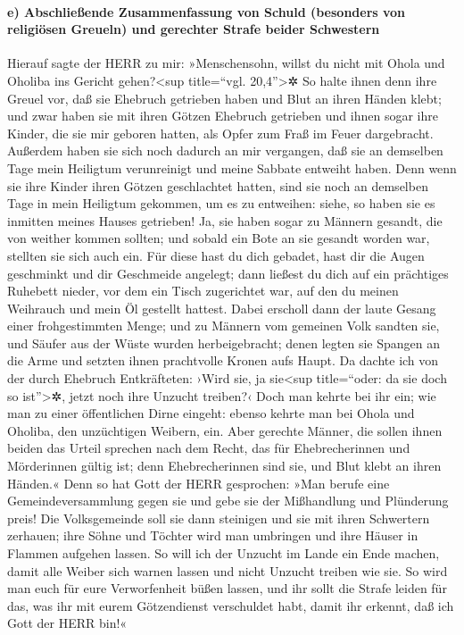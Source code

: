 \hypertarget{e-abschlieuxdfende-zusammenfassung-von-schuld-besonders-von-religiuxf6sen-greueln-und-gerechter-strafe-beider-schwestern}{%
\paragraph{e) Abschließende Zusammenfassung von Schuld (besonders von
religiösen Greueln) und gerechter Strafe beider
Schwestern}\label{e-abschlieuxdfende-zusammenfassung-von-schuld-besonders-von-religiuxf6sen-greueln-und-gerechter-strafe-beider-schwestern}}

Hierauf sagte der HERR zu mir: »Menschensohn, willst du
nicht mit Ohola und Oholiba ins Gericht gehen?\textless sup title=``vgl.
20,4''\textgreater✲ So halte ihnen denn ihre Greuel vor,
daß sie Ehebruch getrieben haben und Blut an ihren Händen
klebt; und zwar haben sie mit ihren Götzen Ehebruch getrieben und ihnen
sogar ihre Kinder, die sie mir geboren hatten, als Opfer zum Fraß im
Feuer dargebracht. Außerdem haben sie sich noch dadurch
an mir vergangen, daß sie an demselben Tage mein Heiligtum verunreinigt
und meine Sabbate entweiht haben. Denn wenn sie ihre
Kinder ihren Götzen geschlachtet hatten, sind sie noch an demselben Tage
in mein Heiligtum gekommen, um es zu entweihen: siehe, so haben sie es
inmitten meines Hauses getrieben! Ja, sie haben sogar zu
Männern gesandt, die von weither kommen sollten; und sobald ein Bote an
sie gesandt worden war, stellten sie sich auch ein. Für diese hast du
dich gebadet, hast dir die Augen geschminkt und dir Geschmeide angelegt;
dann ließest du dich auf ein prächtiges Ruhebett nieder,
vor dem ein Tisch zugerichtet war, auf den du meinen Weihrauch und mein
Öl gestellt hattest. Dabei erscholl dann der laute Gesang
einer frohgestimmten Menge; und zu Männern vom gemeinen Volk sandten
sie, und Säufer aus der Wüste wurden herbeigebracht; denen legten sie
Spangen an die Arme und setzten ihnen prachtvolle Kronen aufs Haupt.
Da dachte ich von der durch Ehebruch Entkräfteten: ›Wird
sie, ja sie\textless sup title=``oder: da sie doch so
ist''\textgreater✲, jetzt noch ihre Unzucht treiben?‹
Doch man kehrte bei ihr ein; wie man zu einer
öffentlichen Dirne eingeht: ebenso kehrte man bei Ohola und Oholiba, den
unzüchtigen Weibern, ein. Aber gerechte Männer, die
sollen ihnen beiden das Urteil sprechen nach dem Recht, das für
Ehebrecherinnen und Mörderinnen gültig ist; denn Ehebrecherinnen sind
sie, und Blut klebt an ihren Händen.« Denn so hat Gott
der HERR gesprochen: »Man berufe eine Gemeindeversammlung gegen sie und
gebe sie der Mißhandlung und Plünderung preis! Die
Volksgemeinde soll sie dann steinigen und sie mit ihren Schwertern
zerhauen; ihre Söhne und Töchter wird man umbringen und ihre Häuser in
Flammen aufgehen lassen. So will ich der Unzucht im Lande
ein Ende machen, damit alle Weiber sich warnen lassen und nicht Unzucht
treiben wie sie. So wird man euch für eure Verworfenheit
büßen lassen, und ihr sollt die Strafe leiden für das, was ihr mit eurem
Götzendienst verschuldet habt, damit ihr erkennt, daß ich Gott der HERR
bin!«

